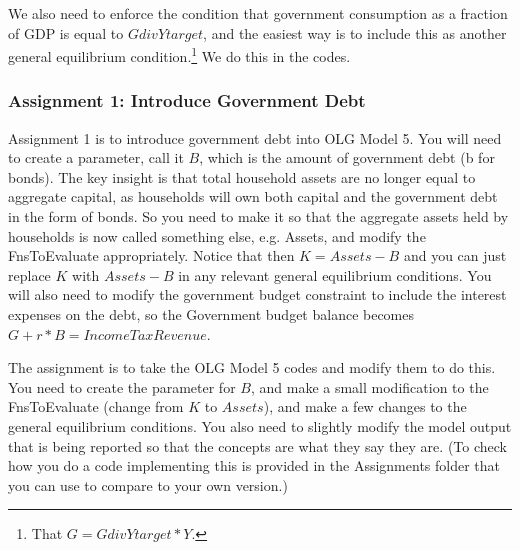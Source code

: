 We also need to enforce the condition that government consumption as a fraction of GDP is equal to $GdivYtarget$, and the easiest way is to include this as another general equilibrium condition.\footnote{That $G=GdivYtarget*Y$.} We do this in the codes. 

\subsubsection{Assignment 1: Introduce Government Debt} \label{sec:govdebt}
Assignment 1 is to introduce government debt into OLG Model 5. You will need to create a parameter, call it $B$, which is the amount of government debt (b for bonds). The key insight is that total household assets are no longer equal to aggregate capital, as households will own both capital and the government debt in the form of bonds. So you need to make it so that the aggregate assets held by households is now called something else, e.g. Assets, and modify the FnsToEvaluate appropriately. Notice that then $K=Assets-B$ and you can just replace $K$ with $Assets-B$ in any relevant general equilibrium conditions. You will also need to modify the government budget constraint to include the interest expenses on the debt, so the Government budget balance becomes $G+r*B=IncomeTaxRevenue$.

The assignment is to take the OLG Model 5 codes and modify them to do this. You need to create the parameter for $B$, and make a small modification to the FnsToEvaluate (change from $K$ to $Assets$), and make a few changes to the general equilibrium conditions. You also need to slightly modify the model output that is being reported so that the concepts are what they say they are. (To check how you do a code implementing this is provided in the Assignments folder that you can use to compare to your own version.)







